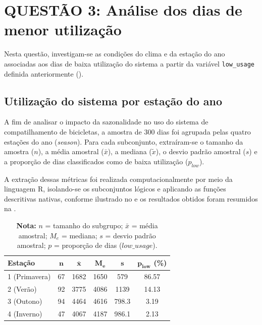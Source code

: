 \documentclass[12pt,a4paper]{article}
\begin{document}
\section{QUESTÃO 3: Análise dos dias de menor utilização}\label{sec:questao3}

Nesta questão, investigam-se as condições do clima e da estação do ano associadas aos dias de baixa utilização do sistema a partir da variável \texttt{low\_usage} definida anteriormente ().

\subsection{Utilização do sistema por estação do ano}

A fim de analisar o impacto da sazonalidade no uso do sistema de compatilhamento de bicicletas, a amostra de 300 dias foi agrupada pelas quatro estações do ano (\textit{season}). Para cada subconjunto, extraíram-se o tamanho da amostra ($n$), a média amostral ($\bar{x}$), a mediana ($\tilde{x}$), o desvio padrão amostral ($s$) e a proporção de dias classificados como de baixa utilização ($p_{low}$).

A extração dessas métricas foi realizada computacionalmente por meio da linguagem R, isolando-se os subconjuntos lógicos e aplicando as funções descritivas nativas, conforme ilustrado no  e os resultados obtidos foram resumidos na .


\begin{table}[H]
    \centering
    \caption{Indicadores estatísticos do volume de usuários categorizados por estação do ano.}
    \label{tab:sazonalidade}
    \begin{tabular}{lccccc}
        \toprule
        \textbf{Estação} & $\boldsymbol{n}$ & $\boldsymbol{\bar{x}}$ & $\boldsymbol{M_e}$ & $\boldsymbol{s}$ & $\boldsymbol{p_{low}}$ \textbf{(\%)} \\
        \midrule
        1 (Primavera) & 67 & 1682 & 1650 & 579 & 86.57 \\
        2 (Verão)     & 92 & 3775 & 4086 & 1139 & 14.13 \\
        3 (Outono)    & 94 & 4464 & 4616 & 798.3 & 3.19 \\
        4 (Inverno)   & 47 & 4067 & 4187 & 986.1 & 2.13 \\
        \bottomrule
    \end{tabular}
    \vspace{2mm}
    \caption*{\small{\textbf{Nota:} $n$ = tamanho do subgrupo; $\bar{x}$ = média amostral; $M_e$ = mediana; $s$ = desvio padrão amostral; $p$ = proporção de dias ($low\_usage$).}}
\end{table}
\end{document}
